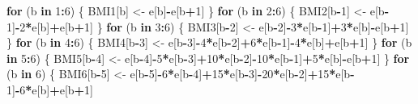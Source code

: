\documentclass[]{article}
\newenvironment{Shaded}{\begin{snugshade}}{\end{snugshade}}
\newcommand{\DecValTok}[1]{\textcolor[rgb]{0.00,0.00,0.81}{#1}}
\newcommand{\StringTok}[1]{\textcolor[rgb]{0.31,0.60,0.02}{#1}}
\newcommand{\ControlFlowTok}[1]{\textcolor[rgb]{0.13,0.29,0.53}{\textbf{#1}}}
\newcommand{\OperatorTok}[1]{\textcolor[rgb]{0.81,0.36,0.00}{\textbf{#1}}}
\newcommand{\NormalTok}[1]{#1}
\begin{document}
\begin{Shaded}
\begin{Highlighting}[]
\ControlFlowTok{for}\NormalTok{ (b }\ControlFlowTok{in} \DecValTok{1}\OperatorTok{:}\DecValTok{6}\NormalTok{) \{}
\NormalTok{  BMI1[b] <-}\StringTok{ }\NormalTok{e[b]}\OperatorTok{-}\NormalTok{e[b}\OperatorTok{+}\DecValTok{1}\NormalTok{]}
\NormalTok{\}}
\ControlFlowTok{for}\NormalTok{ (b }\ControlFlowTok{in} \DecValTok{2}\OperatorTok{:}\DecValTok{6}\NormalTok{) \{}
\NormalTok{  BMI2[b}\OperatorTok{-}\DecValTok{1}\NormalTok{] <-}\StringTok{ }\NormalTok{e[b}\OperatorTok{-}\DecValTok{1}\NormalTok{]}\OperatorTok{-}\DecValTok{2}\OperatorTok{*}\NormalTok{e[b]}\OperatorTok{+}\NormalTok{e[b}\OperatorTok{+}\DecValTok{1}\NormalTok{]}
\NormalTok{\}}
\ControlFlowTok{for}\NormalTok{ (b }\ControlFlowTok{in} \DecValTok{3}\OperatorTok{:}\DecValTok{6}\NormalTok{) \{}
\NormalTok{  BMI3[b}\OperatorTok{-}\DecValTok{2}\NormalTok{] <-}\StringTok{ }\NormalTok{e[b}\OperatorTok{-}\DecValTok{2}\NormalTok{]}\OperatorTok{-}\DecValTok{3}\OperatorTok{*}\NormalTok{e[b}\OperatorTok{-}\DecValTok{1}\NormalTok{]}\OperatorTok{+}\DecValTok{3}\OperatorTok{*}\NormalTok{e[b]}\OperatorTok{-}\NormalTok{e[b}\OperatorTok{+}\DecValTok{1}\NormalTok{]}
\NormalTok{\}}
\ControlFlowTok{for}\NormalTok{ (b }\ControlFlowTok{in} \DecValTok{4}\OperatorTok{:}\DecValTok{6}\NormalTok{) \{}
\NormalTok{  BMI4[b}\OperatorTok{-}\DecValTok{3}\NormalTok{] <-}\StringTok{ }\NormalTok{e[b}\OperatorTok{-}\DecValTok{3}\NormalTok{]}\OperatorTok{-}\DecValTok{4}\OperatorTok{*}\NormalTok{e[b}\OperatorTok{-}\DecValTok{2}\NormalTok{]}\OperatorTok{+}\DecValTok{6}\OperatorTok{*}\NormalTok{e[b}\OperatorTok{-}\DecValTok{1}\NormalTok{]}\OperatorTok{-}\DecValTok{4}\OperatorTok{*}\NormalTok{e[b]}\OperatorTok{+}\NormalTok{e[b}\OperatorTok{+}\DecValTok{1}\NormalTok{]}
\NormalTok{\}}
\ControlFlowTok{for}\NormalTok{ (b }\ControlFlowTok{in} \DecValTok{5}\OperatorTok{:}\DecValTok{6}\NormalTok{) \{}
\NormalTok{  BMI5[b}\OperatorTok{-}\DecValTok{4}\NormalTok{] <-}\StringTok{ }\NormalTok{e[b}\OperatorTok{-}\DecValTok{4}\NormalTok{]}\OperatorTok{-}\DecValTok{5}\OperatorTok{*}\NormalTok{e[b}\OperatorTok{-}\DecValTok{3}\NormalTok{]}\OperatorTok{+}\DecValTok{10}\OperatorTok{*}\NormalTok{e[b}\OperatorTok{-}\DecValTok{2}\NormalTok{]}\OperatorTok{-}\DecValTok{10}\OperatorTok{*}\NormalTok{e[b}\OperatorTok{-}\DecValTok{1}\NormalTok{]}\OperatorTok{+}\DecValTok{5}\OperatorTok{*}\NormalTok{e[b]}\OperatorTok{-}\NormalTok{e[b}\OperatorTok{+}\DecValTok{1}\NormalTok{]}
\NormalTok{\}}
\ControlFlowTok{for}\NormalTok{ (b }\ControlFlowTok{in} \DecValTok{6}\NormalTok{) \{}
\NormalTok{  BMI6[b}\OperatorTok{-}\DecValTok{5}\NormalTok{] <-}\StringTok{ }\NormalTok{e[b}\OperatorTok{-}\DecValTok{5}\NormalTok{]}\OperatorTok{-}\DecValTok{6}\OperatorTok{*}\NormalTok{e[b}\OperatorTok{-}\DecValTok{4}\NormalTok{]}\OperatorTok{+}\DecValTok{15}\OperatorTok{*}\NormalTok{e[b}\OperatorTok{-}\DecValTok{3}\NormalTok{]}\OperatorTok{-}\DecValTok{20}\OperatorTok{*}\NormalTok{e[b}\OperatorTok{-}\DecValTok{2}\NormalTok{]}\OperatorTok{+}\DecValTok{15}\OperatorTok{*}\NormalTok{e[b}\OperatorTok{-}\DecValTok{1}\NormalTok{]}\OperatorTok{-}\DecValTok{6}\OperatorTok{*}\NormalTok{e[b]}\OperatorTok{+}\NormalTok{e[b}\OperatorTok{+}\DecValTok{1}\NormalTok{]}

\end{Highlighting}
\end{Shaded}
\end{document}
